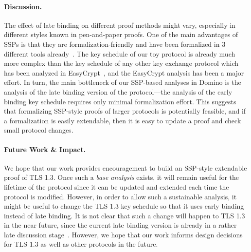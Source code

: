 \paragraph{Discussion.} The effect of late binding on different proof methods might vary, especially in different styles known in pen-and-paper proofs.
One of the main advantages of SSPs is that they are formalization-friendly and have been formalized in 3 different tools already~\cite{CSF:DupKohOec22,Y,CSF:AHRVWH21}.
The key schedule of our toy protocol is already much more complex than the key schedule of any other key exchange protocol which
has been analyzed in EasyCrypt~\cite{X,Y,Z}, and the EasyCrypt analysis has been a major effort. In turn, the main bottleneck of
our SSP-based analyses in Domino is the analysis of the late binding version of the protocol---the analysis of the early binding key schedule
requires only minimal formalization effort. This suggests that formalizing SSP-style proofs of larger protocols is potentially feasible,
and if a formalization is easily extendable, then it is easy to update a proof and check small protocol changes. 

\paragraph{Future Work \& Impact.} We hope that our work provides encouragement to build an SSP-style extendable proof of TLS 1.3. Once such
a \emph{base analysis} exists, it will remain useful for the lifetime of the protocol since it can be updated and extended each time the
protocol is modified. However, in order to allow such a sustainable analysis, it might be useful to change the TLS 1.3 key schedule so that
it uses early binding instead of late binding. It is not clear that such a change will happen to TLS 1.3 in the near future, since the current late binding version is already in a rather late discussion stage~\cite{X}. However, we hope
that our work informs design decisions for TLS 1.3 as well as other protocols in the future.




